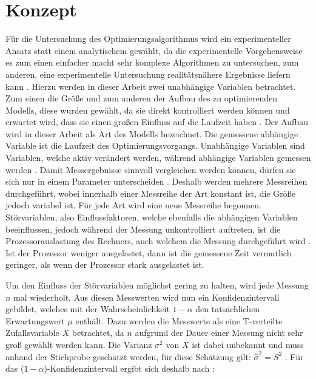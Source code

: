 \chapter{Konzept}

Für die Untersuchung des Optimierungsalgorithmus wird ein experimenteller
Ansatz statt einem analytischem gewählt, da die experimentelle Vorgehensweise
es zum einen einfacher macht sehr komplexe Algorithmen zu untersuchen, zum
anderen, eine experimentelle Untersuchung realitätsnähere Ergebnisse liefern kann
\autocite[vgl.][S.3]{ExperimentalMethods}.
Hierzu werden in dieser Arbeit zwei unabhängige Variablen betrachtet. Zum einen
die Größe und zum anderen der Aufbau des zu optimierenden Modells, diese wurden
gewählt, da sie direkt kontrolliert werden können und erwartet wird, dass sie
einen großen Einfluss auf die Laufzeit haben
\autocite[vgl.][S.506]{ExperimentalAnalysis}. Der Aufbau wird in dieser Arbeit
als Art des Modells bezeichnet. Die gemessene abhängige Variable ist die
Laufzeit des Optimierungsvorgangs. Unabhängige Variablen sind Variablen, welche
aktiv verändert werden, während abhängige Variablen gemessen werden
\autocite[vgl.][S.236]{EmpirischeMethoden}. Damit Messergebnisse sinnvoll
vergleichen werden können, dürfen sie sich nur in einem Parameter unterscheiden
\autocite[vgl.][S.236]{EmpirischeMethoden}. Deshalb werden mehrere Messreihen
durchgeführt, wobei innerhalb einer Messreihe der Art konstant ist, die Größe
jedoch variabel ist. Für jede Art wird eine neue Messreihe begonnen.
Störvariablen, also Einflussfaktoren, welche ebenfalls die abhängigen Variablen
beeinflussen, jedoch während der Messung unkontrolliert auftreten, ist \zB die
Prozessorauslastung des Rechners, auch welchem die Messung durchgeführt wird
\autocite[vgl.][S.237]{EmpirischeMethoden}. Ist der Prozessor weniger
ausgelastet, dann ist die gemessene Zeit vermutlich geringer, als wenn der
Prozessor stark ausgelastet ist.

Um den Einfluss der Störvariablen möglichst
gering zu halten, wird jede Messung $n$ mal wiederholt. Aus diesen Messwerten
wird nun ein Konfidenzintervall gebildet, welches mit der Wahrscheinlichkeit
$1 - \alpha$ den tatsächlichen Erwartungswert $\mu$ enthält. Dazu werden die
Messwerte als eine T-verteilte Zufallsvariable $X$ betrachtet, da $n$ aufgrund
der Dauer einer Messung nicht sehr groß gewählt werden
kann. Die Varianz $\sigma^2$ von $X$ ist dabei unbekannt und muss anhand der Stichprobe geschätzt werden,
für diese Schätzung gilt: $\hat{\sigma}^2 = S^2$ \autocite[vgl][S.528]{Statistik}.
Für das ($1-\alpha$)-Konfidenzintervall ergibt sich deshalb nach \autocite[vgl.][S.533]{Statistik}:

